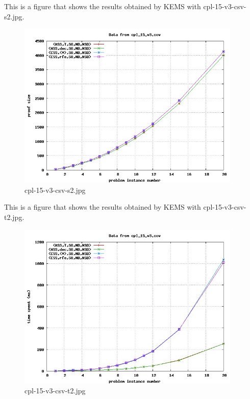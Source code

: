 This is a figure that shows the results obtained by KEMS with cpl-15-v3-csv-s2.jpg.
\begin{figure}[htbp]
\begin{center}
\includegraphics[width=0.95\textwidth]{figuras/cpl-15-v3-csv-s2.jpg}
\end{center}
\caption{cpl-15-v3-csv-s2.jpg}
\end{figure}

This is a figure that shows the results obtained by KEMS with cpl-15-v3-csv-t2.jpg.
\begin{figure}[htbp]
\begin{center}
\includegraphics[width=0.95\textwidth]{figuras/cpl-15-v3-csv-t2.jpg}
\end{center}
\caption{cpl-15-v3-csv-t2.jpg}
\end{figure}

